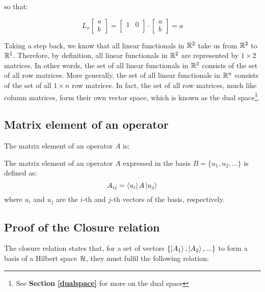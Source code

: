 so that:

\begin{equation}
    L_x\begin{bmatrix}
        a \\ b
    \end{bmatrix} =
    \begin{bmatrix}
        1 & 0 \\
    \end{bmatrix}\cdot
    \begin{bmatrix}
        a \\ b
    \end{bmatrix} = a
\end{equation}

Taking a step back, we know that all linear functionals in $\mathbb{R}^2$ take us from $\mathbb{R}^2$ to $\mathbb{R}^1$. Therefore, by definition, all linear functionals in $\mathbb{R}^2$ are represented by $1\times2$ matrices. In other words, the set of all linear functionals in $\mathbb{R}^2$ consists of the set of all row matrices. More generally, the set of all linear functionals in $\mathbb{R}^n$ consists of the set of all $1\times n$ row matrices. In fact, the set of all row matrices, much like column matrices, form their own vector space, which is known as the dual space\footnote{See \textbf{Section \ref{dualspace}} for more on the dual space}.

\subsection{Matrix element of an operator}

The matrix element of an operator $A$ is:
\begin{definition}
    The matrix element of an operator $A$ expressed in the basis $B = \{u_1, u_2, ...\}$ is defined as:
    \begin{equation}
        A_{ij} = \bra{u_i}A\ket{u_j}
    \end{equation}
    where $u_i$ and $u_j$ are the $i$-th and $j$-th vectors of the basis, respectively.
\end{definition}

\subsection{Proof of the Closure relation} \label{closure_relation_proof}

The closure relation states that, for a set of vectors $\{\ket{A_1}, \ket{A_2}, ...\}$ to form a basis of a Hilbert space $\mathcal{H}$, they must fulfil the following relation:

